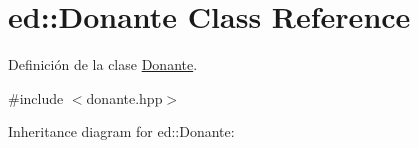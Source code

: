 \hypertarget{classed_1_1Donante}{}\section{ed\+:\+:Donante Class Reference}
\label{classed_1_1Donante}


Definición de la clase \hyperlink{classed_1_1Donante}{Donante}.  




{\ttfamily \#include $<$donante.\+hpp$>$}



Inheritance diagram for ed\+:\+:Donante\+:
